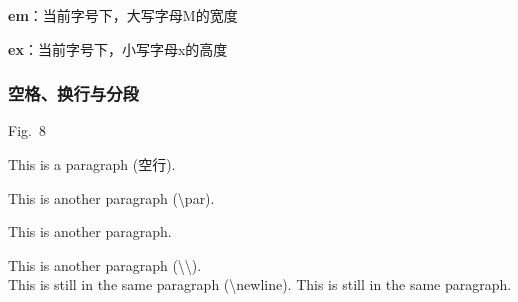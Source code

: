 \documentclass[twoside]{ctexart}
\begin{document}
            \textbf{em}：当前字号下，大写字母M的宽度

            \textbf{ex}：当前字号下，小写字母x的高度


        \subsubsection{空格、换行与分段}
            Fig.~8

            This is a paragraph (空行). 
            
            This is another paragraph (\textbackslash par). 
            \par This is another paragraph. 

            \mbox{}

            This is another paragraph (\textbackslash \textbackslash).\\ %
            This is still in the same paragraph (\textbackslash newline).\newline %
            This is still in the same paragraph.
            
\end{document}
